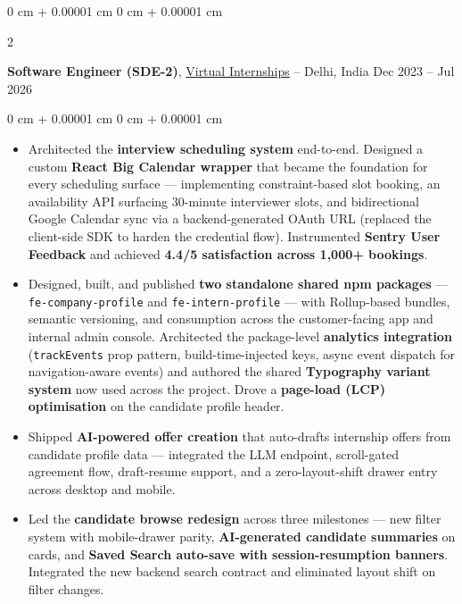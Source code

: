 \documentclass[10pt, letterpaper]{article}
\newenvironment{highlights}{
    \begin{itemize}[
        topsep=0.10 cm,
        parsep=0.10 cm,
        partopsep=0pt,
        itemsep=0pt,
        leftmargin=0 cm + 10pt
    ]
}{
    \end{itemize}
} %
\newenvironment{onecolentry}{
    \begin{adjustwidth}{
        0 cm + 0.00001 cm
    }{
        0 cm + 0.00001 cm
    }
}{
    \end{adjustwidth}
} %
\newenvironment{twocolentry}[2][]{
    \onecolentry
    \def\secondColumn{#2}
    \setcolumnwidth{\fill, 4.5 cm}
    \begin{paracol}{2}
}{
    \switchcolumn \raggedleft \secondColumn
    \end{paracol}
    \endonecolentry
} %
\let\hrefWithoutArrow\href
\begin{document}
        \vspace{0.3 cm}

        \begin{twocolentry}{
            Dec 2023 – Jul 2026
        }
            \textbf{Software Engineer (SDE-2)}, \hrefWithoutArrow{https://www.virtualinternships.com/}{Virtual Internships} -- Delhi, India\end{twocolentry}

        \vspace{0.10 cm}
        \begin{onecolentry}
            \begin{highlights}
    \item Architected the \textbf{interview scheduling system} end-to-end. Designed a custom \textbf{React Big Calendar wrapper} that became the foundation for every scheduling surface — implementing constraint-based slot booking, an availability API surfacing 30-minute interviewer slots, and bidirectional Google Calendar sync via a backend-generated OAuth URL (replaced the client-side SDK to harden the credential flow). Instrumented \textbf{Sentry User Feedback} and achieved \textbf{4.4/5 satisfaction across 1{,}000+ bookings}.

    \item Designed, built, and published \textbf{two standalone shared npm packages} — \texttt{fe-company-profile} and \texttt{fe-intern-profile} — with Rollup-based bundles, semantic versioning, and consumption across the customer-facing app and internal admin console. Architected the package-level \textbf{analytics integration} (\texttt{trackEvents} prop pattern, build-time-injected keys, async event dispatch for navigation-aware events) and authored the shared \textbf{Typography variant system} now used across the project. Drove a \textbf{page-load (LCP) optimisation} on the candidate profile header.

    \item Shipped \textbf{AI-powered offer creation} that auto-drafts internship offers from candidate profile data — integrated the LLM endpoint, scroll-gated agreement flow, draft-resume support, and a zero-layout-shift drawer entry across desktop and mobile.

    \item Led the \textbf{candidate browse redesign} across three milestones — new filter system with mobile-drawer parity, \textbf{AI-generated candidate summaries} on cards, and \textbf{Saved Search auto-save with session-resumption banners}. Integrated the new backend search contract and eliminated layout shift on filter changes.


\end{highlights}
\end{onecolentry}
\end{document}
